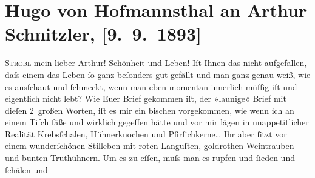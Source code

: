 

         
         \renewcommand{\erwaehntePersonen}{Personen: Richard Beer-Hofmann, Friedrich Michael Fels, Hugo von Hofmannsthal, Hugo August von Hofmannsthal, Anna von Hofmannsthal, Felix Salten}
         \renewcommand{\erwaehnteOrte}{Orte: Böhmen, München, Nürnberg, Strobl, Strohgasse, Wien, Znaim}
         \renewcommand{\erwaehnteWerke}{}
               \section[Hugo von Hofmannsthal an Arthur Schnitzler, {[}9. 9. 1893{]}]{ Hugo von Hofmannsthal an Arthur Schnitzler, {[}9. 9. 1893{]}}\nopagebreak{}\rehead{ }\begin{ledgroupsized}[t]{13cm}\normalsize\beginnumbering \toendnotes[C]{\smallbreak\pagebreak[2]} 
\toendnotes[C]{\smallbreak}\pstart
           \raggedleft{}{\pb}\textsc{Strobl}\pend
           \pstart{}mein lieber Arthur!\pend\pstart
           Schönheit und Leben! Iſt Ihnen das nicht aufgefallen, daſs einem das Leben ſo ganz
               beſonders gut gefällt und man ganz genau weiß, wie es ausſchaut und ſchmeckt, wenn
               man eben momentan innerlich müſſig iſt und eigentlich nicht lebt? Wie Euer Brief gekommen iſt, der
               »launige« Brief mit dieſen 2 großen Worten, iſt es mir ein bischen vorgekommen, wie
               wenn ich an einem Tiſch ſäße und wirklich gegeſſen hätte und vor mir lägen in
               unappetitlicher Realität {\pb}Krebsſchalen, Hühnerknochen und Pfirſichkerne{\dots} Ihr aber
               ſitzt vor einem wunderſchönen Stilleben mit roten Languſten, goldrothen Weintrauben
               und bunten Truthühnern. Um es zu eſſen, muſs man es rupfen und ſieden und ſchälen und

\end{ledgroupsized}
